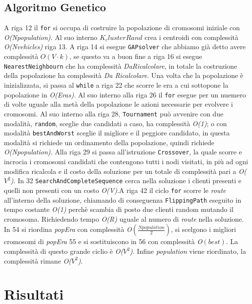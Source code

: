 \documentclass[]{article}
\begin{document}
\subsection{Algoritmo Genetico}
A riga 12 il \texttt{for} si occupa di costruire la popolazione di cromosomi iniziale con \emph{O(Npopulation)}. Al suo interno \emph{$K_clusterRand$} crea i centroidi con complessità \emph{O(Nvehicles)} riga 13. A riga 14 si esegue \texttt{GAPsolver} che abbiamo già detto avere complessità 
 \emph{$O(V \cdot k)$}, se questo va a buon fine  a riga 16  si esegue \texttt{NearestNeighbourn} che ha complessità \emph{DaRicalcolare}, in totale la costruzione della popolazione ha complessità \emph{Da Ricalcolare}. 
 Una volta che la popolazione è inizializzata, si passa al \texttt{while} a riga 22 che scorre le era a cui sottopone la popolazione in \emph{O(Eras)}. Al suo interno alla riga 26 il \texttt{for} esegue per un nuemero di volte uguale alla metà della popolazione le azioni necessarie per evolvere i cromosomi.
 Al suo interno alla riga 28, \texttt{Tournament} può avvenire con due modalità, \texttt{random}, sceglie due candidati a caso, ha complessità \emph{O(1)}; o con modalità \texttt{bestAndWorst} sceglie il migliore e il peggiore candidato, in questa modalità si richiede un ordinamento della popolazione, quindi richiede \emph{O(Npopulation)}. Alla riga 29 si passa all'istruzione \texttt{Crossover}, la quale scorre e incrocia i cromosomi candidati che contengono tutti i nodi visitati, in più ad ogni modifica ricalcola e il costo della soluzione per un totale di complessità pari a \emph{O($V^2$)}. In 32 \texttt{SearchAndCompleteSequence} cerca nella soluzione i clienti presenti e quelli non presenti con un costo \emph{O(V)}.A riga 42 il ciclo \texttt{for} scorre le \emph{route} all'interno della soluzione, chiamando di conseguenza \texttt{FlippingPath} eseguito in tempo costante \emph{O(1)} perchè scambia di posto due clienti random mutando il cromosoma. Richiedendo tempo \emph{O(R)} uguale al numero di \emph{route} nella soluzione.
 In 54 si riordina \textit{popEra} con complessità \emph{O$(\frac{Npopulation}{2})$}, si scelgono i migliori cromosomi di \textit{popEra} 55 e si sostituiscono  in 56 con complessità \emph{O$(best)$}. La complessità di questo grande ciclio è \emph{O($V^2$)}.
 Infine \textit{population} viene riordinato, la complessità rimane  \emph{O($V^2$)}.

\newpage
 
\section{Risultati}
 
\end{document}
